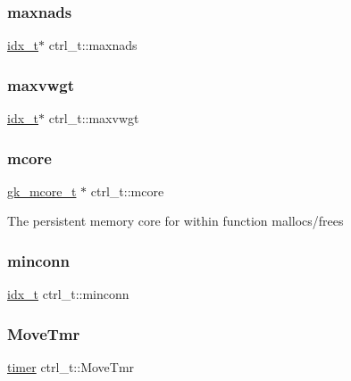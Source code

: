 \mbox{\label{a00742_ac4f8f5cda17ac6d950c61ba575af566c}} 
\subsubsection{\texorpdfstring{maxnads}{maxnads}}
{\footnotesize\ttfamily \hyperlink{a00876_aaa5262be3e700770163401acb0150f52}{idx\+\_\+t}$\ast$ ctrl\+\_\+t\+::maxnads}

\mbox{\label{a00742_a02e0b5b3209303d1ec1634de01a10e88}} 
\subsubsection{\texorpdfstring{maxvwgt}{maxvwgt}}
{\footnotesize\ttfamily \hyperlink{a00876_aaa5262be3e700770163401acb0150f52}{idx\+\_\+t}$\ast$ ctrl\+\_\+t\+::maxvwgt}

\mbox{\label{a00742_aa46cd6966a7472f31f8463b6ca99ec52}} 
\subsubsection{\texorpdfstring{mcore}{mcore}}
{\footnotesize\ttfamily \hyperlink{a00682}{gk\+\_\+mcore\+\_\+t} $\ast$ ctrl\+\_\+t\+::mcore}

The persistent memory core for within function mallocs/frees \mbox{\label{a00742_aeecdd5a52f8624eb1563bea4ba696caf}} 
\subsubsection{\texorpdfstring{minconn}{minconn}}
{\footnotesize\ttfamily \hyperlink{a00876_aaa5262be3e700770163401acb0150f52}{idx\+\_\+t} ctrl\+\_\+t\+::minconn}

\mbox{\label{a00742_a4c4c2d93b216dea60bd360d5a706350c}} 
\subsubsection{\texorpdfstring{Move\+Tmr}{MoveTmr}}
{\footnotesize\ttfamily \hyperlink{a00978_aae821c36bb7e6918e1414484f939c3d4}{timer} ctrl\+\_\+t\+::\+Move\+Tmr}

